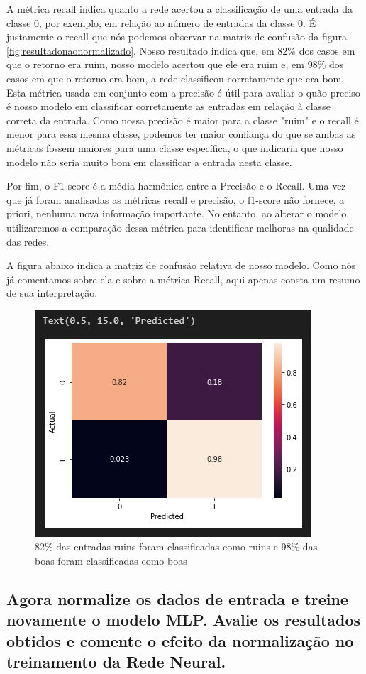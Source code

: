 \documentclass[12pt]{article}
\begin{document}
A métrica recall indica quanto a rede acertou a classificação de uma entrada da classe 0, por exemplo, em relação ao número de entradas da classe 0. É justamente o recall que nós podemos observar na matriz de confusão da figura \ref{fig:resultadonaonormalizado}. Nosso resultado indica que, em 82\% dos casos em que o retorno era ruim, nosso modelo acertou que ele era ruim e, em 98\% dos casos em que o retorno era bom, a rede  classificou corretamente que era bom. Esta métrica usada em conjunto com a precisão é útil para avaliar o quão preciso é nosso modelo em classificar corretamente as entradas em relação à classe correta da entrada. Como nossa precisão é maior para a classe "ruim" e o recall é menor para essa mesma classe, podemos ter maior confiança do que se ambas as métricas fossem maiores para uma classe específica, o que indicaria que nosso modelo não seria muito bom em classificar a entrada nesta classe.

Por fim, o F1-score  é a média harmônica entre a Precisão e o Recall. Uma vez que já foram analisadas as métricas recall e precisão, o f1-score não fornece, a priori, nenhuma nova informação importante. No entanto, ao alterar o modelo, utilizaremos a comparação dessa métrica para identificar melhoras na qualidade das redes.

A figura abaixo indica a matriz de confusão relativa de nosso modelo. Como nós já comentamos sobre ela e sobre a métrica Recall, aqui apenas consta um resumo de sua interpretação.
\begin{figure}[H]
	\centering
	\includegraphics[width=0.5\linewidth]{Imagens/ConfusionMatrizNaoNormalizado}
	\caption{82\% das entradas ruins foram classificadas como ruins e 98\% das boas foram classificadas como boas}
	\label{fig:confusionmatriznaonormalizado}
\end{figure}




\subsection{Agora normalize os dados de entrada e treine novamente o modelo MLP.	Avalie os resultados obtidos e comente o efeito da normalização no	treinamento da Rede Neural.}\label{subsec:normalizada}
	
\end{document}
